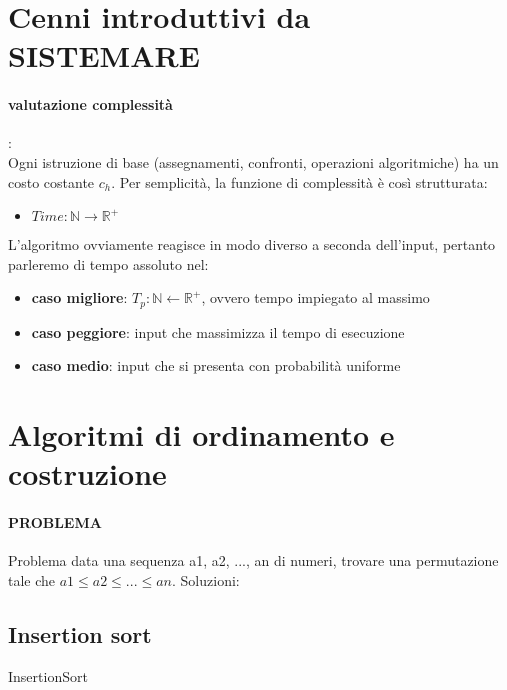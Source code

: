 \documentclass{article}
\begin{document}
\section{Cenni introduttivi da SISTEMARE}
\paragraph{valutazione complessità}: \\
Ogni istruzione di base (assegnamenti, confronti, operazioni algoritmiche) ha un costo costante $c_h$.
Per semplicità, la funzione di complessità è così strutturata:
\begin{itemize}
    \item $Time: \mathbb{N} \rightarrow \mathbb{R^+}$
\end{itemize}
L'algoritmo ovviamente reagisce in modo diverso a seconda dell'input, pertanto parleremo di tempo assoluto nel:
\begin{itemize}
    \item \textbf{caso migliore}: $T_p:\mathbb{N} \leftarrow \mathbb{R^+}$, ovvero tempo impiegato al massimo
    \item \textbf{caso peggiore}: input che massimizza il tempo di esecuzione
    \item \textbf{caso medio}: input che si presenta con probabilità uniforme
\end{itemize}
\section{Algoritmi di ordinamento e costruzione}
\paragraph{PROBLEMA} Problema data una sequenza a1, a2, ..., an di numeri, trovare una permutazione tale che 
$a1 \leq a2  \leq ... \leq an$. \newline
Soluzioni:
\hypertarget{insertionsort}{} \subsection{Insertion sort}  %


    \begin{algorithm}[H] 
        \caption{InsertionSort\label{IR}}
        \end{algorithm}
\end{document}
